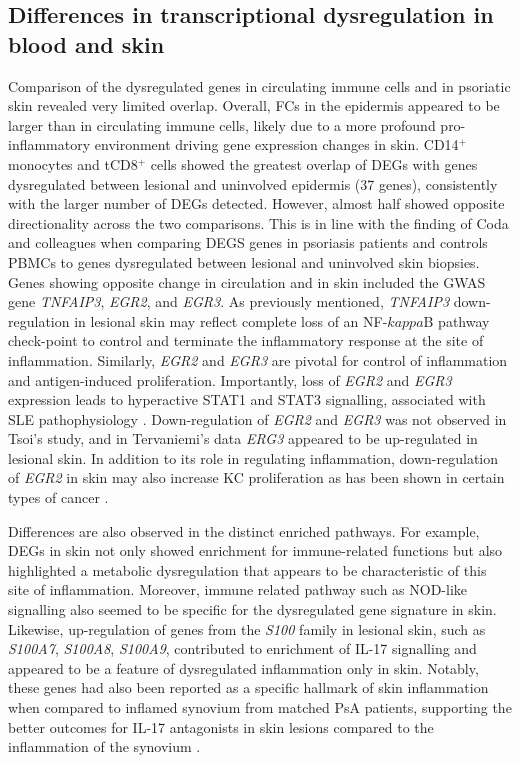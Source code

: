 \subsection{Differences in transcriptional dysregulation in blood and skin}
Comparison of the dysregulated genes in circulating immune cells and in psoriatic skin revealed very limited overlap.  Overall, FCs in the epidermis appeared to be larger than in circulating immune cells, likely due to a more profound pro-inflammatory environment driving gene expression changes in skin. CD14$^+$ monocytes and tCD8$^+$ cells showed the greatest overlap of DEGs with genes dysregulated between lesional and uninvolved epidermis (37 genes), consistently with the larger number of DEGs detected. However, almost half showed opposite directionality across the two comparisons. This is in line with the finding of Coda and colleagues when comparing DEGS genes in psoriasis patients and controls PBMCs to genes dysregulated between lesional and uninvolved skin biopsies. 
Genes showing opposite change in circulation and in skin included the GWAS gene \textit{TNFAIP3}, \textit{EGR2}, and \textit{EGR3}. As previously mentioned, \textit{TNFAIP3} down-regulation in lesional skin may reflect complete loss of an NF-$kappa$B pathway check-point to control and terminate the inflammatory response at the site of inflammation. Similarly, \textit{EGR2} and \textit{EGR3} are pivotal for control of inflammation and antigen-induced proliferation. Importantly, loss of \textit{EGR2} and \textit{EGR3} expression leads to hyperactive STAT1 and STAT3 signalling, associated with SLE pathophysiology \parencite{Li2012}. Down-regulation of \textit{EGR2} and \textit{EGR3} was not observed in Tsoi’s study, and in Tervaniemi’s data \textit{ERG3} appeared to be up-regulated in lesional skin. In addition to its role in regulating inflammation, down-regulation of \textit{EGR2} in skin may also increase KC proliferation as has been shown in certain types of cancer \parencite{Wu2010}.


Differences are also observed in the distinct enriched pathways. For example, DEGs in skin not only showed enrichment for immune-related functions but also highlighted a metabolic dysregulation that appears to be characteristic of this site of inflammation. Moreover, immune related pathway such as NOD-like signalling also seemed to be specific for the dysregulated gene signature in skin. Likewise, up-regulation of genes from the \textit{S100} family in lesional skin, such as \textit{S100A7}, \textit{S100A8}, \textit{S100A9}, contributed to enrichment of IL-17 signalling and appeared to be a feature of dysregulated inflammation only in skin. Notably, these genes had also been reported as a specific hallmark of skin inflammation when compared to inflamed synovium from matched PsA patients, supporting the better outcomes for IL-17 antagonists in skin lesions compared to the inflammation of the synovium \parencite{Belasco2015}.



